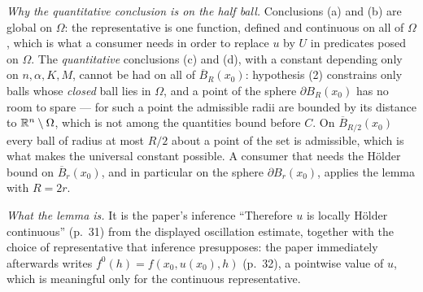 \begin{lemma}
\emph{Why the quantitative conclusion is on the half ball.}  Conclusions (a) and
(b) are global on $\Omega$: the representative is one function, defined and
continuous on all of $\Omega$, which is what a consumer needs in order to
replace $u$ by $U$ in predicates posed on $\Omega$.  The \emph{quantitative}
conclusions (c) and (d), with a constant depending only on $n,\alpha,K,M$,
cannot be had on all of $\overline B_R(x_0)$: hypothesis (2) constrains only
balls whose \emph{closed} ball lies in $\Omega$, and a point of the sphere
$\partial B_R(x_0)$ has no room to spare --- for such a point the admissible
radii are bounded by its distance to $\mathbb{R}^n\setminus\Omega$, which is not among
the quantities bound before $C$.  On $\overline B_{R/2}(x_0)$ every ball of
radius at most $R/2$ about a point of the set is admissible, which is what makes
the universal constant possible.  A consumer that needs the H\"older bound on
$\overline B_r(x_0)$, and in particular on the sphere $\partial B_r(x_0)$,
applies the lemma with $R=2r$.

\emph{What the lemma is.}  It is the paper's inference ``Therefore $u$ is locally
H\"older continuous'' (p.~31) from the displayed oscillation estimate, together
with the choice of representative that inference presupposes: the paper
immediately afterwards writes $f^0(h)=f(x_0,u(x_0),h)$ (p.~32), a pointwise
value of $u$, which is meaningful only for the continuous representative.
\end{lemma}
